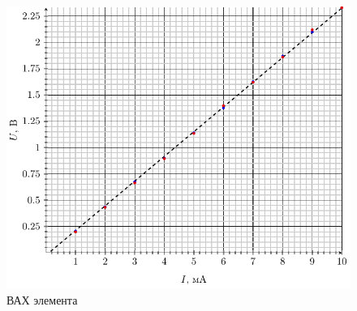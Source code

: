 
\pagestyle{empty} 
\fancyhead{} 
\fancyhead[R]{} 
\fancyhead[L]{} 

\fancyfoot{} 
\fancyfoot[C]{\thepage} 
\usepackage{colortbl}
 


\newpage

\newpage

\begin{figure}[H]
	\centering
	\includegraphics[width=\textwidth]{img/vax}
	\caption{ВАХ элемента}
	\label{fig:figr}
\end{figure}


